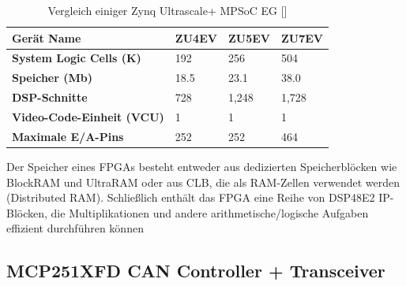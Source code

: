 \begin{table}[H]
	\centering
	\begin{tabular}{|p{5cm}|p{2cm}|p{2cm}|p{2cm}|}
		\toprule
		\textbf{Gerät Name} & ZU4EV & ZU5EV & ZU7EV \\
		\midrule
		\textbf{System Logic Cells (K)} & 192 & 256 & 504 \\
		\textbf{Speicher (Mb)} & 18.5 & 23.1 & 38.0 \\
		\textbf{DSP-Schnitte} & 728 & 1,248 & 1,728 \\
		\textbf{Video-Code-Einheit (VCU)} & 1 & 1 & 1 \\
		\textbf{Maximale E/A-Pins} & 252 & 252 & 464 \\
		\bottomrule
	\end{tabular}
	\caption[Vergleich einiger Zynq Ultrascale+ MPSoC EG ]{Vergleich einiger Zynq Ultrascale+ MPSoC EG [\cite{XilinxInc.}]}
	\label{tab:zcu:vergleich}
\end{table}

Der Speicher eines FPGAs besteht entweder aus dedizierten Speicherblöcken wie BlockRAM und UltraRAM oder aus CLB, die als RAM-Zellen verwendet werden (Distributed RAM). Schließlich enthält das FPGA eine Reihe von DSP48E2 IP-Blöcken, die Multiplikationen und andere arithmetische/logische Aufgaben effizient durchführen können

\subsection{MCP251XFD CAN Controller + Transceiver}

